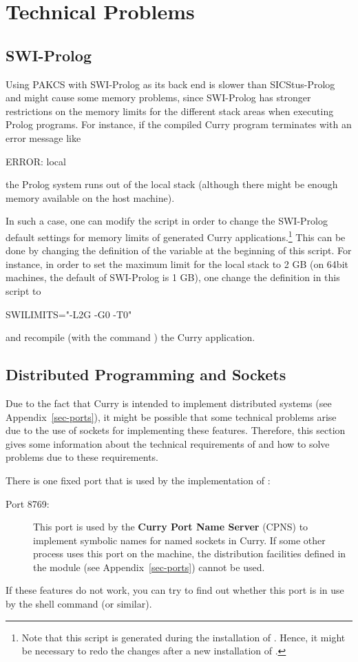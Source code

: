 \section{Technical Problems}

\subsection{SWI-Prolog}

Using PAKCS with SWI-Prolog as its back end is slower than
SICStus-Prolog and might cause some memory problems,
since SWI-Prolog has stronger restrictions on the memory limits
for the different stack areas when executing Prolog programs.
For instance, if the compiled Curry program terminates
with an error message like
\begin{curry}
ERROR: local
\end{curry}
the Prolog system runs out of the local stack (although there
might be enough memory available on the host machine).

In such a case, one can modify the script
in order to change the SWI-Prolog default settings
for memory limits of generated Curry applications.\footnote{%
Note that this script is generated
during the installation of \CYS. Hence, it might be necessary
to redo the changes after a new installation of \CYS.}
This can be done by changing the definition of the variable
 at the beginning of this script.
For instance, in order to set the maximum limit for
the local stack to 2 GB (on 64bit machines, the default of SWI-Prolog
is 1 GB), one change the definition in this script to
\begin{curry}
SWILIMITS="-L2G -G0 -T0"
\end{curry}
and recompile (with the \CYS command )
the Curry application.


\subsection{Distributed Programming and Sockets}

Due to the fact that Curry is intended to implement
distributed systems (see Appendix~\ref{sec-ports}),
it might be possible that some technical problems
arise due to the use of sockets for implementing these
features. Therefore, this section gives some information
about the technical requirements of \CYS and how to solve
problems due to these requirements.

There is one fixed port that is used by the implementation of \CYS:
\begin{description}
\item[Port 8769:] This port is used by the
{\bf Curry Port Name Server} (CPNS) to implement symbolic names for
named sockets in Curry.
If some other process uses this port on the machine,
the distribution facilities defined in the module 
(see Appendix~\ref{sec-ports}) cannot be used.
\end{description}
If these features do not work, you can try to find out
whether this port is in use by the shell command
 (or similar).

